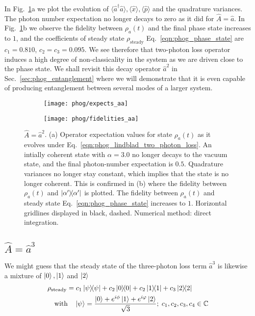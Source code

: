 In Fig.~\ref{fig:phog_lindblad_two_photon_loss}a we plot the evolution of $\langle \hat{a}^\dagger \hat{a}\rangle, \langle \hat{x}\rangle, \langle \hat{p}\rangle$ and the quadrature variances. The photon number expectation no longer decays to zero as it did for $\hat{A}=\hat{a}$. %
 In Fig.~\ref{fig:phog_lindblad_two_photon_loss}b we observe the fidelity between $\rho_a\left(t\right)$ and the final phase state increases to $1$, and the coefficients of steady state $\rho_{\text{steady}}$ Eq.~\ref{eqn:phog_phase_state} are $c_1 = 0.810$, $c_2 = c_3 = 0.095$. We see therefore that two-photon loss operator induces a high degree of non-classicality in the system as we are driven close to the phase state. We shall revisit this decay operator $\hat{a}^2$ in Sec.~\ref{sec:phog_entanglement} where we will demonstrate that it is even capable of producing entanglement between several modes of a larger system.


\begin{figure}[htp]
\centering
	\begin{subfigure}{0.49\linewidth}
	\centering
	\texttt{[image: phog/expects\_aa]}
	\caption{}
	\end{subfigure}
	\begin{subfigure}{0.49\linewidth}
	\centering
	\texttt{[image: phog/fidelities\_aa]}
	\caption{}
	\end{subfigure}
\caption{\label{fig:phog_lindblad_two_photon_loss}$\hat{A} = \hat{a}^2$. (a) Operator expectation values for state $\rho_a\left(t\right)$ as it evolves under Eq.~\ref{eqn:phog_lindblad_two_photon_loss}. An intially coherent state with $\alpha=3.0$ no longer decays to the vacuum state, and the final photon-number expectation is $0.5$. Quadrature variances no longer stay constant, which implies that the state is no longer coherent. This is confirmed in (b) where the fidelity between $\rho_a\left(t\right)$ and $\dyad{\alpha^\prime}$ is plotted. The fidelity between $\rho_a\left(t\right)$ and steady state Eq.~\ref{eqn:phog_phase_state} increases to $1$. Horizontal gridlines displayed in black, dashed. Numerical method: direct integration.}
\end{figure}

\iffalse
\clearpage
\subsection{$\hat{A} = \hat{a}^3$}\label{sec:A_aaa}
We might guess that the steady state of the three-photon loss term $\hat{a}^3$ is likewise a mixture of $\ket{0}, \ket{1}$ and $\ket{2}$
\begin{align}\label{eqn:phog_three_photon_loss_ss}
&\rho_{\text{steady}} = c_1 \dyad{\psi} + c_2 \dyad{0} + c_2 \dyad{1} + c_3 \dyad{2} \notag \\
%
&\qq{with} \ket{\psi} = \frac{\ket{0} + e^{i \phi}\ket{1} + e^{i \varphi}\ket{2}}{\sqrt{3}}; \; c_1, c_2, c_3, c_4 \in \mathbb{C}
\end{align}

